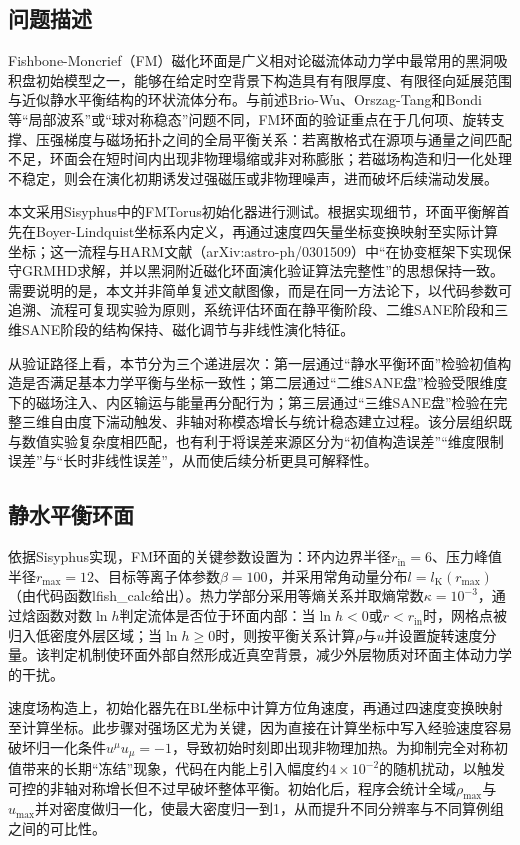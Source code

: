 \subsection{问题描述}
Fishbone-Moncrief（FM）磁化环面是广义相对论磁流体动力学中最常用的黑洞吸积盘初始模型之一，能够在给定时空背景下构造具有有限厚度、有限径向延展范围与近似静水平衡结构的环状流体分布。与前述Brio-Wu、Orszag-Tang和Bondi等“局部波系”或“球对称稳态”问题不同，FM环面的验证重点在于几何项、旋转支撑、压强梯度与磁场拓扑之间的全局平衡关系：若离散格式在源项与通量之间匹配不足，环面会在短时间内出现非物理塌缩或非对称膨胀；若磁场构造和归一化处理不稳定，则会在演化初期诱发过强磁压或非物理噪声，进而破坏后续湍动发展。

本文采用Sisyphus中的FMTorus初始化器进行测试。根据实现细节，环面平衡解首先在Boyer-Lindquist坐标系内定义，再通过速度四矢量坐标变换映射至实际计算坐标；这一流程与HARM文献（arXiv:astro-ph/0301509）中“在协变框架下实现保守GRMHD求解，并以黑洞附近磁化环面演化验证算法完整性”的思想保持一致。需要说明的是，本文并非简单复述文献图像，而是在同一方法论下，以代码参数可追溯、流程可复现实验为原则，系统评估环面在静平衡阶段、二维SANE阶段和三维SANE阶段的结构保持、磁化调节与非线性演化特征。

从验证路径上看，本节分为三个递进层次：第一层通过“静水平衡环面”检验初值构造是否满足基本力学平衡与坐标一致性；第二层通过“二维SANE盘”检验受限维度下的磁场注入、内区输运与能量再分配行为；第三层通过“三维SANE盘”检验在完整三维自由度下湍动触发、非轴对称模态增长与统计稳态建立过程。该分层组织既与数值实验复杂度相匹配，也有利于将误差来源区分为“初值构造误差”“维度限制误差”与“长时非线性误差”，从而使后续分析更具可解释性。

\subsection{静水平衡环面}
依据Sisyphus实现，FM环面的关键参数设置为：环内边界半径$ r_{\mathrm{in}}=6 $、压力峰值半径$ r_{\max}=12 $、目标等离子体参数$\beta=100$，并采用常角动量分布$ l=l_{\mathrm{K}}(r_{\max}) $（由代码函数lfish\_calc给出）。热力学部分采用等熵关系并取熵常数$\kappa=10^{-3}$，通过焓函数对数$\ln h$判定流体是否位于环面内部：当$\ln h<0$或$r<r_{\mathrm{in}}$时，网格点被归入低密度外层区域；当$\ln h\ge 0$时，则按平衡关系计算$\rho$与$u$并设置旋转速度分量。该判定机制使环面外部自然形成近真空背景，减少外层物质对环面主体动力学的干扰。

速度场构造上，初始化器先在BL坐标中计算方位角速度，再通过四速度变换映射至计算坐标。此步骤对强场区尤为关键，因为直接在计算坐标中写入经验速度容易破坏归一化条件$u^\mu u_\mu=-1$，导致初始时刻即出现非物理加热。为抑制完全对称初值带来的长期“冻结”现象，代码在内能上引入幅度约$4\times10^{-2}$的随机扰动，以触发可控的非轴对称增长但不过早破坏整体平衡。初始化后，程序会统计全域$\rho_{\max}$与$u_{\max}$并对密度做归一化，使最大密度归一到1，从而提升不同分辨率与不同算例组之间的可比性。

